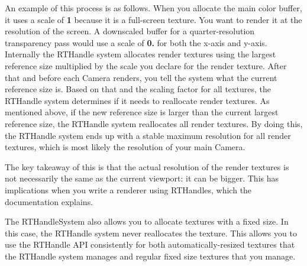 An example of this process is as follows. When you allocate the main color buffer, it uses a scale of {\bfseries{1}} because it is a full-\/screen texture. You want to render it at the resolution of the screen. A downscaled buffer for a quarter-\/resolution transparency pass would use a scale of {\bfseries{0.}} for both the x-\/axis and y-\/axis. Internally the RTHandle system allocates render textures using the largest reference size multiplied by the scale you declare for the render texture. After that and before each Camera renders, you tell the system what the current reference size is. Based on that and the scaling factor for all textures, the RTHandle system determines if it needs to reallocate render textures. As mentioned above, if the new reference size is larger than the current largest reference size, the RTHandle system reallocates all render textures. By doing this, the RTHandle system ends up with a stable maximum resolution for all render textures, which is most likely the resolution of your main Camera.

The key takeaway of this is that the actual resolution of the render textures is not necessarily the same as the current viewport\+: it can be bigger. This has implications when you write a renderer using RTHandles, which the  documentation explains.

The RTHandle\+System also allows you to allocate textures with a fixed size. In this case, the RTHandle system never reallocates the texture. This allows you to use the RTHandle API consistently for both automatically-\/resized textures that the RTHandle system manages and regular fixed size textures that you manage. 